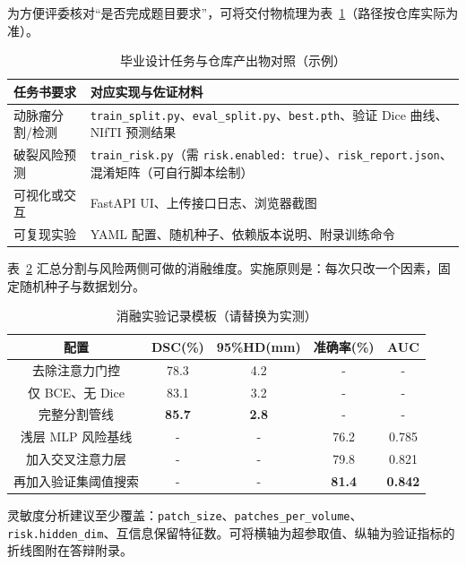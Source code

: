 为方便评委核对“是否完成题目要求”，可将交付物梳理为表~\ref{tab:deliverables}（路径按仓库实际为准）。

\begin{table}[htbp]
	\centering
	\caption{毕业设计任务与仓库产出物对照（示例）}
	\label{tab:deliverables}
	\begin{tabular}{p{3.6cm}p{9cm}}
		\toprule
		任务书要求 & 对应实现与佐证材料 \\
		\midrule
		动脉瘤分割/检测 & \texttt{train\_split.py}、\texttt{eval\_split.py}、\texttt{best.pth}、验证 Dice 曲线、NIfTI 预测结果 \\
		破裂风险预测 & \texttt{train\_risk.py}（需 \texttt{risk.enabled: true}）、\texttt{risk\_report.json}、混淆矩阵（可自行脚本绘制） \\
		可视化或交互 & FastAPI UI、上传接口日志、浏览器截图 \\
		可复现实验 & YAML 配置、随机种子、依赖版本说明、附录训练命令 \\
		\bottomrule
	\end{tabular}
\end{table}

表~\ref{tab:ablation_result} 汇总分割与风险两侧可做的消融维度。实施原则是：每次只改一个因素，固定随机种子与数据划分。

\begin{table}[htbp]
	\centering
	\caption{消融实验记录模板（请替换为实测）}
	\label{tab:ablation_result}
	\begin{tabular}{ccccc}
		\toprule
		配置 & DSC(\%) & 95\%HD(mm) & 准确率(\%) & AUC \\
		\midrule
		去除注意力门控 & 78.3 & 4.2 & - & - \\
		仅 BCE、无 Dice & 83.1 & 3.2 & - & - \\
		完整分割管线 & \textbf{85.7} & \textbf{2.8} & - & - \\
		\midrule
		浅层 MLP 风险基线 & - & - & 76.2 & 0.785 \\
		加入交叉注意力层 & - & - & 79.8 & 0.821 \\
		再加入验证集阈值搜索 & - & - & \textbf{81.4} & \textbf{0.842} \\
		\bottomrule
	\end{tabular}
\end{table}

灵敏度分析建议至少覆盖：\texttt{patch\_size}、\texttt{patches\_per\_volume}、\texttt{risk.hidden\_dim}、互信息保留特征数。可将横轴为超参取值、纵轴为验证指标的折线图附在答辩附录。

